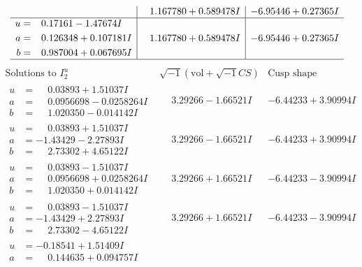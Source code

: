 \documentclass[1p]{elsarticle_modified}
\theoremstyle{definition}
\newcommand{\I}{\sqrt{-1}}
\begin{document}
$$\begin{array}{c|c|c}
 & \phantom{-}1.167780 + 0.589478 I & -6.95446 + 0.27365 I \\ \hline\begin{aligned}
u &= \phantom{-}0.17161 - 1.47674 I \\
a &= \phantom{-}0.126348 + 0.107181 I \\
b &= \phantom{-}0.987004 + 0.067695 I\end{aligned}
 & \phantom{-}1.167780 + 0.589478 I & -6.95446 + 0.27365 I\\
 \hline 
 \end{array}$$\newpage$$\begin{array}{c|c|c}  
\text{Solutions to }I^u_{2}& \I (\text{vol} + \sqrt{-1}CS) & \text{Cusp shape}\\
 \hline 
\begin{aligned}
u &= \phantom{-}0.03893 + 1.51037 I \\
a &= \phantom{-}0.0956698 - 0.0258264 I \\
b &= \phantom{-}1.020350 - 0.014142 I\end{aligned}
 & \phantom{-}3.29266 - 1.66521 I & -6.44233 + 3.90994 I \\ \hline\begin{aligned}
u &= \phantom{-}0.03893 + 1.51037 I \\
a &= -1.43429 - 2.27893 I \\
b &= \phantom{-}2.73302 + 4.65122 I\end{aligned}
 & \phantom{-}3.29266 - 1.66521 I & -6.44233 + 3.90994 I \\ \hline\begin{aligned}
u &= \phantom{-}0.03893 - 1.51037 I \\
a &= \phantom{-}0.0956698 + 0.0258264 I \\
b &= \phantom{-}1.020350 + 0.014142 I\end{aligned}
 & \phantom{-}3.29266 + 1.66521 I & -6.44233 - 3.90994 I \\ \hline\begin{aligned}
u &= \phantom{-}0.03893 - 1.51037 I \\
a &= -1.43429 + 2.27893 I \\
b &= \phantom{-}2.73302 - 4.65122 I\end{aligned}
 & \phantom{-}3.29266 + 1.66521 I & -6.44233 - 3.90994 I \\ \hline\begin{aligned}
u &= -0.18541 + 1.51409 I \\
a &= \phantom{-}0.144635 + 0.094757 I \\

\end{aligned}
\end{array}$$
\end{document}
